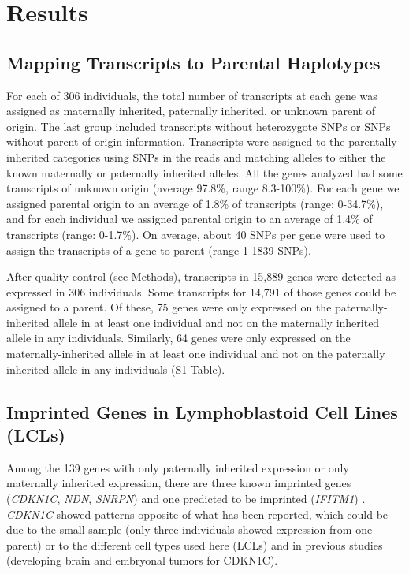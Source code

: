 \section{Results}\label{ch03-results}
\subsection{Mapping Transcripts to Parental Haplotypes}\label{Mapping Transcripts to Parental Haplotypes}
For each of 306 individuals, the total number of transcripts at each gene was assigned as maternally inherited, paternally inherited, or unknown parent of origin. The last group included transcripts without heterozygote SNPs or SNPs without parent of origin information. Transcripts were assigned to the parentally inherited categories using SNPs in the reads and matching alleles to either the known maternally or paternally inherited alleles. All the genes analyzed had some transcripts of unknown origin (average 97.8\%, range 8.3-100\%). For each gene we assigned parental origin to an average of 1.8\% of transcripts (range: 0-34.7\%), and for each individual we assigned parental origin to an average of 1.4\% of transcripts (range: 0-1.7\%). On average, about 40 SNPs per gene were used to assign the transcripts of a gene to parent (range 1-1839 SNPs). 

After quality control (see Methods), transcripts in 15,889 genes were detected as expressed in 306 individuals. Some transcripts for 14,791 of those genes could be assigned to a parent. Of these, 75 genes were only expressed on the paternally-inherited allele in at least one individual and not on the maternally inherited allele in any individuals. Similarly, 64 genes were only expressed on the maternally-inherited allele in at least one individual and not on the paternally inherited allele in any individuals (S1 Table).

\subsection{Imprinted Genes in Lymphoblastoid Cell Lines (LCLs)}\label{Imprinted Genes in Lymphoblastoid Cell Lines (LCLs)}
Among the 139 genes with only paternally inherited expression or only maternally inherited expression, there are three known imprinted genes (\emph{CDKN1C}, \emph{NDN}, \emph{SNRPN}) and one predicted to be imprinted (\emph{IFITM1}) \cite{Luedi:2007ib}. \emph{CDKN1C} showed patterns opposite of what has been reported\cite{Hatada:1995jf,Matsuoka:1996uq}, which could be due to the small sample (only three individuals showed expression from one parent) or to the different cell types used here (LCLs) and in previous studies (developing brain and embryonal tumors for CDKN1C).

